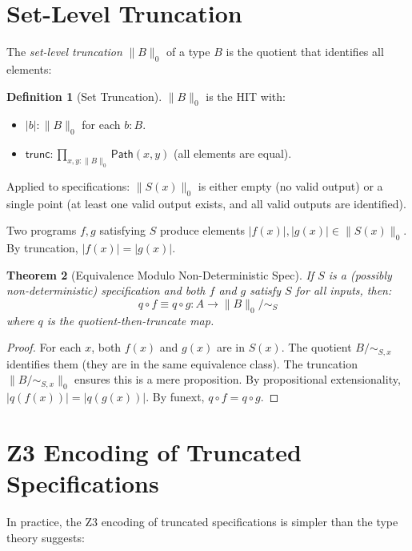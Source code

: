 \documentclass[11pt,a4paper]{report}
\theoremstyle{definition}
\newtheorem{definition}{Definition}[chapter]
\theoremstyle{plain}
\newtheorem{theorem}[definition]{Theorem}
\newcommand{\Path}{\mathsf{Path}}
\begin{document}
\section{Set-Level Truncation}

The \emph{set-level truncation} $\|B\|_0$ of a type $B$ is the
quotient that identifies all elements:

\begin{definition}[Set Truncation]
$\|B\|_0$ is the HIT with:
\begin{itemize}
  \item $|b| : \|B\|_0$ for each $b : B$.
  \item $\mathsf{trunc} : \prod_{x, y : \|B\|_0} \Path(x, y)$
    (all elements are equal).
\end{itemize}
\end{definition}

Applied to specifications: $\|S(x)\|_0$ is either empty (no valid
output) or a single point (at least one valid output exists, and
all valid outputs are identified).

Two programs $f, g$ satisfying $S$ produce elements $|f(x)|, |g(x)|
\in \|S(x)\|_0$.  By truncation, $|f(x)| = |g(x)|$.

\begin{theorem}[Equivalence Modulo Non-Deterministic Spec]
If $S$ is a (possibly non-deterministic) specification and both $f$
and $g$ satisfy $S$ for all inputs, then:
\[
  q \circ f \equiv q \circ g : A \to \|B\|_0 / {\sim_S}
\]
where $q$ is the quotient-then-truncate map.
\end{theorem}

\begin{proof}
For each $x$, both $f(x)$ and $g(x)$ are in $S(x)$.  The quotient
$B / {\sim_{S,x}}$ identifies them (they are in the same equivalence
class).  The truncation $\|B / {\sim_{S,x}}\|_0$ ensures this is a
mere proposition.  By propositional extensionality,
$|q(f(x))| = |q(g(x))|$.  By funext, $q \circ f = q \circ g$.
\end{proof}

\section{Z3 Encoding of Truncated Specifications}

In practice, the Z3 encoding of truncated specifications is simpler
than the type theory suggests:
\end{document}
